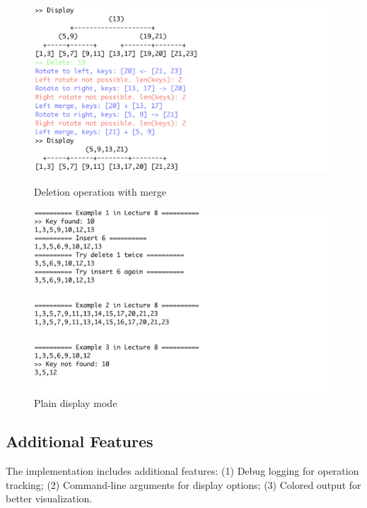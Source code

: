 \documentclass[11pt]{article}
\begin{document}
\begin{figure}[h!]
    \begin{minipage}[t]{0.48\textwidth}
        \centering
        \includegraphics[width=\textwidth]{figs/deletion_with_merge.png}
        \caption{Deletion operation with merge}
        \label{fig:deletion_with_merge}
        \end{minipage}
    \hfill
    \begin{minipage}[t]{0.48\textwidth}
        \centering
        \includegraphics[width=\textwidth]{figs/plain.png}
        \caption{Plain display mode}
        \label{fig:plain}
    \end{minipage}
\end{figure}


\subsection{Additional Features}
The implementation includes additional features: (1) Debug logging for operation tracking; (2) Command-line arguments for display options; (3) Colored output for better visualization.
\end{document}
